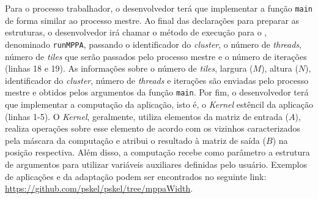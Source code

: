 Para o processo trabalhador, o desenvolvedor terá que implementar a função \texttt{main}
de forma similar ao processo mestre. Ao final das declarações para preparar as
estruturas, o desenvolvedor irá chamar o método de execução para o \mppa,
denominado \texttt{runMPPA}, passando o identificador do \textit{cluster}, o número de \textit{threads},
número de \textit{tiles} que serão passados pelo processo mestre e o número de iterações
(linhas 18 e 19). As informações sobre o número de \textit{tiles}, largura ($M$),
altura ($N$), identificador do \textit{cluster}, número de \textit{threads} e
iterações são enviadas pelo processo mestre e obtidos pelos argumentos
da função \texttt{main}. Por fim, o desenvolvedor terá que implementar a computação da aplicação, isto é,
o \textit{Kernel} estêncil da aplicação (linhas 1-5). O \textit{Kernel}, geralmente, utiliza
elementos da matriz de entrada ($A$), realiza operações sobre esse elemento de
acordo com os vizinhos caracterizados pela máscara da computação e atribui o
resultado à matriz de saída ($B$) na posição respectiva. Além disso, a computação
recebe como parâmetro a estrutura de argumentos para utilizar variáveis
auxiliares definidas pelo usuário. Exemplos de aplicações e da
adaptação podem ser encontrados no seguinte link:
\url{https://github.com/pskel/pskel/tree/mppaWidth}.






